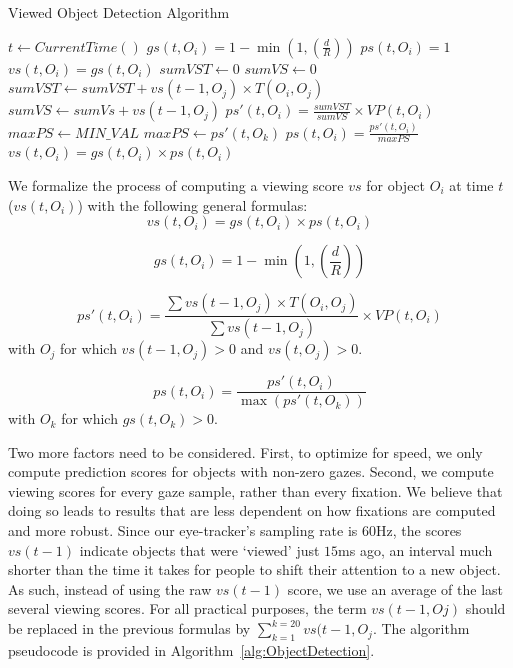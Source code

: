\begin{algorithm}
\caption{Viewed Object Detection Algorithm}\label{alg:ObjectDetection}
\begin{algorithmic}[1]
	\State $t \gets CurrentTime()$
	\State $gs(t, O_i) = 1 - \min{(1, (\frac{d}{R}))}$
		\State $ps(t, O_i) = 1$
		\State $vs(t, O_i) = gs(t,O_i)$
	\Else
		\State $sumVST \gets 0$
		\State $sumVS \gets 0$
				\State $sumVST \gets sumVST + vs(t-1, O_j) \times T(O_i,O_j)$
				\State $sumVS \gets sumVs + vs(t-1, O_j)$				
			\EndIf
		\EndFor
		\State $ps'(t, O_i) = \frac{sumVST}{sumVS} \times VP(t, O_i)$
		\State $maxPS \gets MIN\_VAL$
				\State $maxPS \gets ps'(t,O_k)$
			\EndIf
		\EndFor
		\State $ps(t,O_i) = \frac{ps'(t, O_i)}{maxPS}$
		\State $vs(t, O_i) = gs(t, O_i) \times ps(t, O_i)$
	\EndIf
\EndFor
\end{algorithmic}
\end{algorithm}

We formalize the process of computing a viewing score $vs$ for object $O_i$ at time $t$  ($vs(t,O_i)$) with the following general formulas:
\begin{equation}
vs(t, O_i) = gs(t, O_i) \times ps(t, O_i)
\label{eq:VS}
\end{equation}

\begin{equation}
gs(t, O_i) = 1 - \min{(1, (\frac{d}{R}))}
\label{eq:GS}
\end{equation}

\begin{equation}
ps'(t, O_i) = \frac{\sum{vs(t-1, O_j)} \times T(O_i,O_j)}{\sum{vs(t-1, O_j)}} \times VP(t, O_i)
\label{eq:PSDash}
\end{equation}
with $O_j$ for which $vs(t-1, O_j) > 0$ and $vs(t, O_j) > 0$.

\begin{equation}
ps(t,O_i) = \frac{ps'(t, O_i)}{\max (ps'(t, O_k))}
\label{eq:PS}
\end{equation}
with $O_k$ for which $gs(t,O_k) >0$.

Two more factors need to be considered. First, to optimize for speed, we only compute prediction scores for objects with non-zero gazes. Second, we compute viewing scores for every gaze sample, rather than every fixation. We believe that doing so leads to results that are less dependent on how fixations are computed and more robust. Since our eye-tracker's sampling rate is $60$Hz, the scores $vs(t-1)$ indicate objects that were `viewed' just $15$ms ago, an interval much shorter than the time it takes for people to shift their attention to a new object. As such, instead of using the raw $vs(t-1)$ score, we use an average of the last several viewing scores. For all practical purposes, the term $vs(t-1,Oj)$ should be replaced in the previous formulas by $ \sum_{k=1}^{k=20}{vs(t-1, O_j}$. The algorithm pseudocode is provided in Algorithm~\ref{alg:ObjectDetection}.


